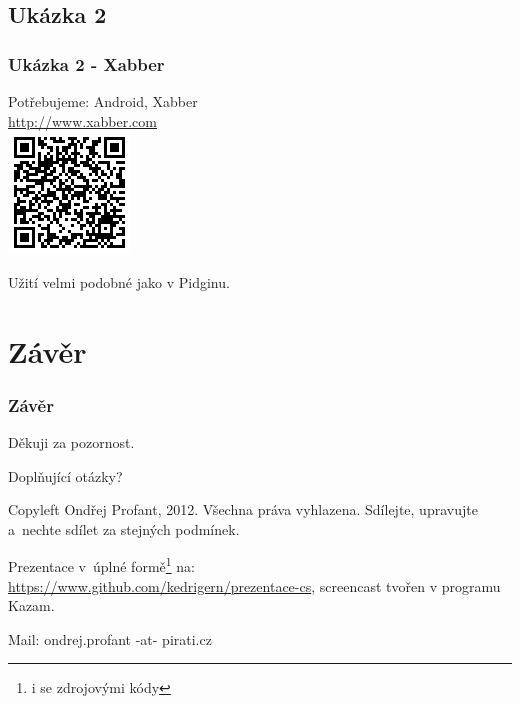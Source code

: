 \documentclass[xetex]{beamer}
\begin{document}
\subsection{Ukázka 2}
\begin{frame}
	\frametitle{Ukázka 2 - Xabber}
	Potřebujeme: Android, Xabber\\
	\url{http://www.xabber.com}\\
	\includegraphics{pic/xabber-android.png}

	Užití velmi podobné jako v Pidginu. 
\end{frame}


\section{Závěr}

\begin{frame}
  \frametitle{Závěr}
	Děkuji za pozornost.

	\bigskip
	
	Doplňující otázky?

	\bigskip

	\bigskip

	\scriptsize
	Copyleft Ondřej Profant, 2012. Všechna práva vyhlazena. Sdílejte, upravujte a~nechte sdílet za stejných podmínek. 

	\bigskip

	Prezentace v~úplné formě\footnote{i se zdrojovými kódy} na:\\ 
	\url{https://www.github.com/kedrigern/prezentace-cs}, screencast tvořen v programu Kazam.

	\bigskip

	Mail: ondrej.profant -at- pirati.cz 
\end{frame}
\end{document}
